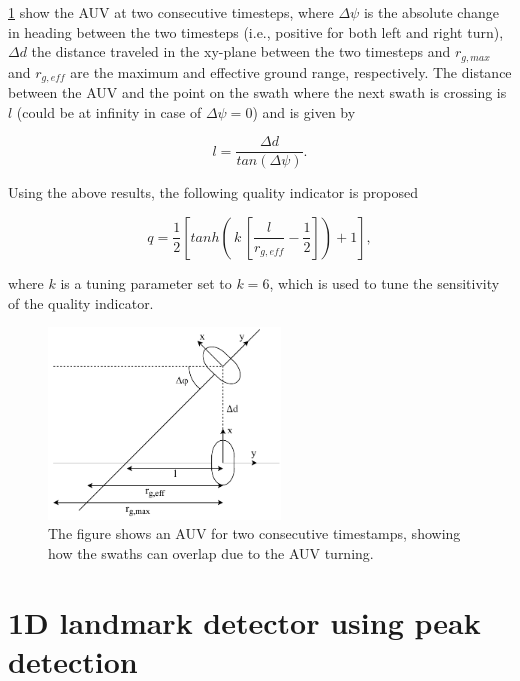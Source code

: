 \cref{fig:quality_ind} show the AUV at two consecutive timesteps, where $\Delta \psi$ is the absolute change in heading between the two timesteps (i.e., positive for both left and right turn), $\Delta d$ the distance traveled in the xy-plane between the two timesteps and $r_{g, max}$ and $r_{g, eff}$ are the maximum and effective ground range, respectively. The distance between the AUV and the point on the swath where the next swath is crossing is $l$ (could be at infinity in case of $\Delta \psi = 0$) and is given by

\begin{equation}
    l = \frac{\Delta d}{tan(\Delta \psi)}.
    \label{eq:l_qi}
\end{equation}

Using the above results, the following quality indicator is proposed

\begin{equation}
    q = \frac{1}{2}[tanh( \,k\, [\frac{l}{r_{g, eff}} - \frac{1}{2}]) + 1],
\end{equation}

where $k$ is a tuning parameter set to $k = 6$, which is used to tune the sensitivity of the quality indicator. 

\begin{figure}
    \centering
    \includegraphics[width=0.55\textwidth]{figures/quality_ind.drawio.pdf}
    \caption{The figure shows an AUV for two consecutive timestamps, showing how the swaths can overlap due to the AUV turning.}
    \label{fig:quality_ind}
\end{figure}

\section{1D landmark detector using peak detection}

